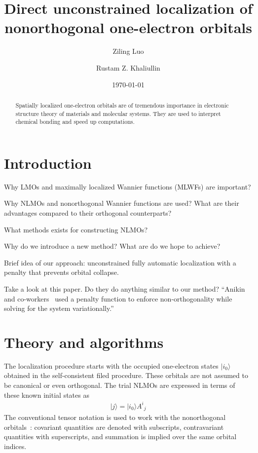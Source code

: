 \documentclass[aps,prl,reprint,amsmath,amssymb]{revtex4-1}
\newcommand{\ket}[1]{\ensuremath{\vert #1 \rangle}}
\begin{document}



\title{
Direct unconstrained localization of nonorthogonal one-electron orbitals
}

\author{Ziling Luo}
\author{Rustam Z. Khaliullin}

\date{\today}

\begin{abstract}
Spatially localized one-electron orbitals are of tremendous importance in electronic structure theory of materials and molecular systems. 
They are used to interpret chemical bonding and speed up computations. 
\end{abstract}

\maketitle

\section{Introduction} 

Why LMOs and maximally localized Wannier functions (MLWFs) are important?

Why NLMOs and nonorthogonal Wannier functions are used? What are their advantages compared to their orthogonal counterparts?

What methods exists for constructing NLMOs? 

Why do we introduce a new method? What are do we hope to achieve?

Brief idea of our approach: unconstrained fully automatic localization with a penalty that prevents orbital collapse.

Take a look at this paper. 
Do they do anything similar to our method? 
``Anikin and co-workers~\cite{anikin2004} used a penalty function to enforce non-orthogonality while solving for the system variationally.''


\section{Theory and algorithms}

The localization procedure starts with the occupied one-electron states $\ket{i_0}$ obtained in the self-consistent filed procedure. These orbitals are not assumed to be canonical or even orthogonal. The trial NLMOs are expressed in terms of these known initial states as
%
\begin{equation}
\begin{split}
\ket{j} = \ket{i_0} {A^i}_j  
\end{split}
\end{equation}
%
The conventional tensor notation is used to work with the nonorthogonal orbitals~\cite{head1998tensor}: covariant quantities are denoted with subscripts, contravariant quantities with superscripts, and summation is implied over the same orbital indices.
\end{document}
